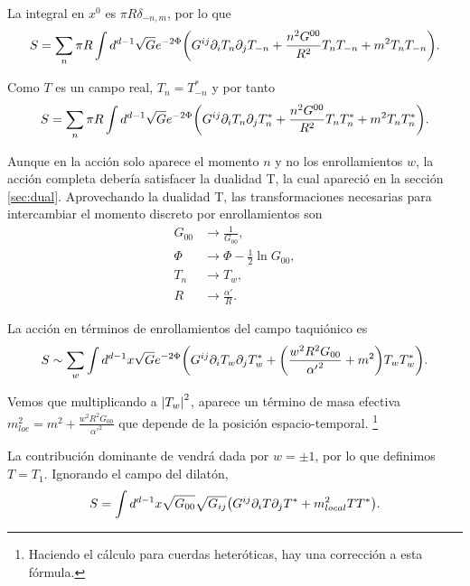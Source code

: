 La integral en $x^0$ es $\pi R \delta_{-n,m}$, por lo que
\begin{equation}
  S=\sum_n\pi R \int d^{d-1} \sqrt{G}e^{-2\Phi}\qty(G^{ij}\partial_i T_n \partial_j T_{-n} + \frac{n^2 G^{00}}{R^2}T_n T_{-n} + m^2 T_n T_{-n}).
\end{equation}

Como $T$ es un campo real, $T_n=T^*_{-n}$ y por tanto
\begin{equation}
  S=\sum_n \pi R \int d^{d-1} \sqrt{G}e^{-2\Phi}\qty(G^{ij}\partial_i T_n \partial_j T_{n}^* + \frac{n^2 G^{00}}{R^2}T_n T_{n}^* + m^2 T_n T_{n}^*).
\end{equation}

Aunque en la acción solo aparece el momento $n$ y no los enrollamientos $w$, la acción completa debería satisfacer la dualidad T, 
la cual apareció en la sección \ref{sec:dual}.
Aprovechando la dualidad T, las  transformaciones necesarias para intercambiar el momento discreto por enrollamientos son
\begin{equation}
  \begin{aligned}
    G_{00}&\to \frac{1}{G_{00}},\\
    \Phi&\to \Phi -\frac{1}{2}\ln G_{00},\\
    T_n&\to T_w,\\
    R &\to \frac{\alpha'}{R}.
  \end{aligned}
\end{equation}

La acción en términos de enrollamientos del campo taquiónico es
\begin{equation}
  S \sim\sum_w  \int d^{d-1} x \sqrt G e^{-2\Phi}\qty(G^{ij}\partial_i T_w \partial_j T_{w}^* + \qty(\frac{w^2 R^2 G_{00}}{{\alpha'}^2} + m^2) T_w T_{w}^*) .
\end{equation}

Vemos que multiplicando a $\abs{T_w}^2$, aparece un término de masa efectiva $m^2_{loc} = m^2 +\frac{w^2 R^2 G_{00}}{{\alpha'}^2}$
que depende de la posición espacio-temporal.
\footnote{Haciendo el cálculo para cuerdas heteróticas, hay una corrección a esta fórmula.}

La contribución dominante de vendrá dada por $w=\pm 1$, por lo que definimos $T=T_1$.
Ignorando el campo del dilatón,
\begin{equation}
  S  =  \int d^{d-1} x \sqrt{G_{00}}\sqrt{G_{ij}} \qty(G^{ij}\partial_i T \partial_j T^* +m^2_{local} TT^*) .
\end{equation}

